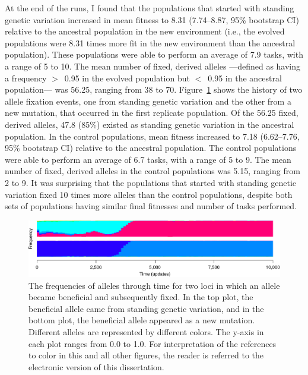\begin{doublespace}
At the end of the runs, I found that
the populations that started with standing genetic variation
increased in mean fitness to 8.31 (7.74--8.87, 95\% bootstrap CI)
relative to the ancestral population in the new environment
(i.e., the evolved populations were 8.31 times
more fit in the new environment than the ancestral population).
%
These populations were able to perform
an average of 7.9 tasks, with a range of 5 to 10.
%
The mean number of fixed, derived alleles%
---defined as having a frequency $>$~0.95 in the evolved population
but $<$~0.95 in the ancestral population---%
was 56.25, ranging from 38 to 70.
%
Figure~\ref{allele-freq-plot} shows
the history of two allele fixation events,
one from standing genetic variation and the other from a new mutation,
that occurred in the first replicate population.
%
Of the 56.25 fixed, derived alleles,
47.8 (85\%) existed as standing genetic variation
in the ancestral population.
%
In the control populations, mean fitness increased
to 7.18 (6.62--7.76, 95\% bootstrap CI)
relative to the ancestral population.
%
The control populations were able to perform
an average of 6.7 tasks, with a range of 5 to 9.
%
The mean number of fixed, derived alleles
in the control populations was 5.15, ranging from 2 to 9.
%
It was surprising that the populations
that started with standing genetic variation
fixed 10 times more alleles than the control populations,
despite both sets of populations
having similar final fitnesses and
number of tasks performed.



\begin{figure}
\begin{center}
\includegraphics[width=\linewidth]{allele-freq-plot.pdf}
\caption{The frequencies of alleles through time for two loci
  in which an allele became beneficial and subsequently fixed.
  In the top plot, the beneficial allele came from standing genetic variation,
  and in the bottom plot, the beneficial allele appeared as a new mutation.
  Different alleles are represented by different colors.
  The y-axis in each plot ranges from 0.0 to 1.0.
  For interpretation of the references to color in this and all other figures, 
  the reader is referred to the electronic version of this dissertation.}
\label{allele-freq-plot}
\end{center}
\end{figure}




\end{doublespace}
